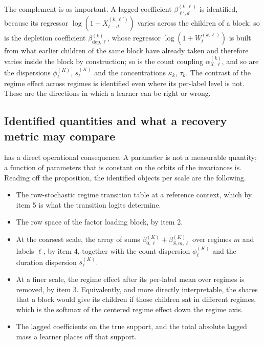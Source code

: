 \begin{remark}
\label{rem:not_invariant}
The complement is as important. A lagged coefficient
$\beta_{\ell',d}^{(k,\ell)}$ is identified, because its regressor
$\log(1 + X_{t-d}^{(k,\ell')})$ varies across the children of a block; so is
the depletion coefficient $\beta_{\mathrm{dep},\ell}^{(k)}$, whose regressor
$\log(1 + W_t^{(k,\ell)})$ is built from what earlier children of the same
block have already taken and therefore varies inside the block by
construction; so is the count coupling $\alpha_{X,\ell}^{(k)}$, and so are the
dispersions $\phi_\ell^{(K)}$, $s_\ell^{(K)}$ and the concentrations
$\kappa_k$, $\tau_k$. The contrast of the regime effect across regimes is
identified even where its per-label level is not. These are the directions in
which a learner can be right or wrong.
\end{remark}

\subsection{Identified quantities and what a recovery metric may compare}
\label{sec:identified_quantities}

 has a direct operational consequence. A parameter is
not a measurable quantity; a function of parameters that is constant on the
orbits of the invariances is. Reading off the proposition, the identified
objects per scale are the following.

\begin{itemize}
\item The row-stochastic regime transition table at a reference context, which
by item 5 is what the transition logits determine.
\item The row space of the factor loading block, by item 2.
\item At the coarsest scale, the array of sums
$\beta_{0,\ell}^{(K)} + \beta_{S,m,\ell}^{(K)}$ over regimes $m$ and labels
$\ell$, by item 4, together with the count dispersion $\phi_\ell^{(K)}$ and the
duration dispersion $s_\ell^{(K)}$.
\item At a finer scale, the regime effect after its per-label mean over regimes
is removed, by item 3. Equivalently, and more directly interpretable, the
shares that a block would give its children if those children sat in different
regimes, which is the softmax of the centered regime effect down the regime
axis.
\item The lagged coefficients on the true support, and the total absolute
lagged mass a learner places off that support.
\end{itemize}

